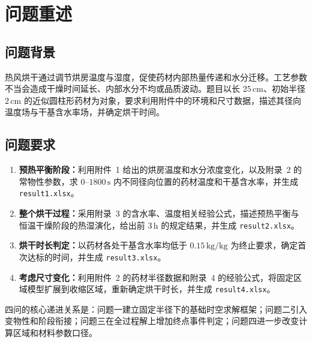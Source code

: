 \section{问题重述}

\subsection{问题背景}

热风烘干通过调节烘房温度与湿度，促使药材内部热量传递和水分迁移。工艺参数不当会造成干燥时间延长、内部水分不均或品质波动。题目以长 $25\,\mathrm{cm}$、初始半径 $2\,\mathrm{cm}$ 的近似圆柱形药材为对象，要求利用附件中的环境和尺寸数据，描述其径向温度场与干基含水率场，并确定烘干时间。

\subsection{问题要求}

\begin{enumerate}
  \item \textbf{预热平衡阶段：}利用附件~1 给出的烘房温度和水分浓度变化，以及附录~2 的常物性参数，求 $0$--$1800\,\mathrm{s}$ 内不同径向位置的药材温度和干基含水率，并生成 \texttt{result1.xlsx}。
  \item \textbf{整个烘干过程：}采用附录~3 的含水率、温度相关经验公式，描述预热平衡与恒温干燥阶段的热湿演化，给出前 $3\,\mathrm{h}$ 的规定结果，并生成 \texttt{result2.xlsx}。
  \item \textbf{烘干时长判定：}以药材各处干基含水率均低于 $0.15\,\mathrm{kg/kg}$ 为终止要求，确定首次达标的时间，并生成 \texttt{result3.xlsx}。
  \item \textbf{考虑尺寸变化：}利用附件~2 的药材半径数据和附录~4 的经验公式，将固定区域模型扩展到收缩区域，重新确定烘干时长，并生成 \texttt{result4.xlsx}。
\end{enumerate}

四问的核心递进关系是：问题一建立固定半径下的基础时空求解框架；问题二引入变物性和阶段衔接；问题三在全过程解上增加终点事件判定；问题四进一步改变计算区域和材料参数口径。


